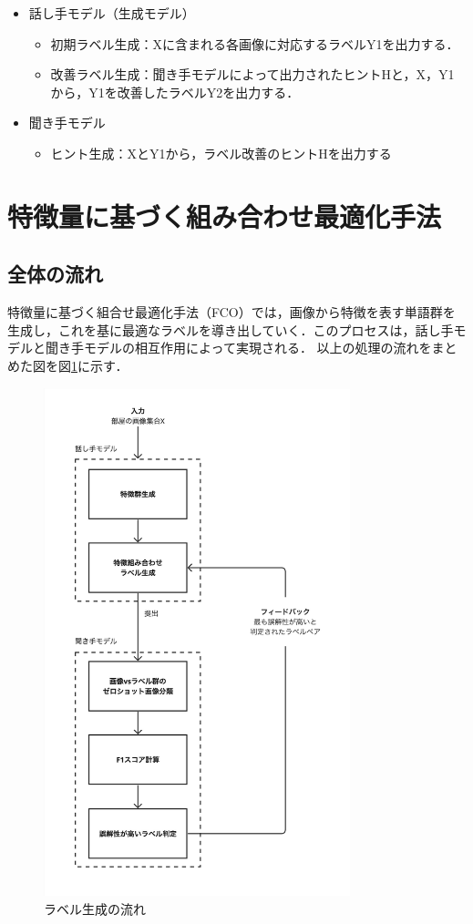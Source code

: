 \documentclass[a4paper,11pt]{jreport}
\begin{document}
\begin{itemize}
  \item 話し手モデル（生成モデル）
    \begin{itemize}
      \item 初期ラベル生成：Xに含まれる各画像に対応するラベルY1を出力する．
      \item 改善ラベル生成：聞き手モデルによって出力されたヒントHと，X，Y1から，Y1を改善したラベルY2を出力する．
    \end{itemize}
  \item 聞き手モデル
    \begin{itemize}
      \item ヒント生成：XとY1から，ラベル改善のヒントHを出力する
    \end{itemize}
\end{itemize}
	

\section{特徴量に基づく組み合わせ最適化手法}
\subsection{全体の流れ}
特徴量に基づく組合せ最適化手法（FCO）では，画像から特徴を表す単語群を生成し，これを基に最適なラベルを導き出していく．このプロセスは，話し手モデルと聞き手モデルの相互作用によって実現される．
以上の処理の流れをまとめた図を図\ref{fig:cof_flow_example}に示す．

\begin{figure}[H]
  \centering
  \includegraphics[width=3.5in]{figures/COF_flow.jpg}
  \caption{ラベル生成の流れ}
  \label{fig:cof_flow_example}
\end{figure}
\end{document}
